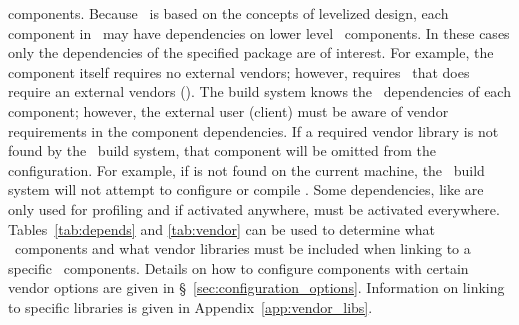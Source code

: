 components.  Because \draco\ is based on the concepts of levelized
design, each component in \draco\ may have dependencies
on lower level \draco\ components.  In these cases only the dependencies
of the specified package are of interest.  For example, the  
component itself requires no external vendors; however,  requires
\cfour\ that does require an external vendors ().  The build system
knows the \draco\ dependencies of each component; however, the external
user (client) must be aware of vendor requirements in the component
dependencies.  If a required vendor library is not found by the \draco\ build system, that component will be omitted from the configuration.  For example, if  is not found on the current machine, the \draco\ build system will not attempt to configure or compile .  Some dependencies, like  are only used for profiling and if activated anywhere, must be activated everywhere.
Tables~\ref{tab:depends} and \ref{tab:vendor} can be
used to determine what \draco\ components and what vendor libraries must
be included when linking to a specific \draco\ components.  Details on
how to configure components with certain vendor options are given in
\S~\ref{sec:configuration_options}.  Information on linking to
specific libraries is given in Appendix~\ref{app:vendor_libs}.

